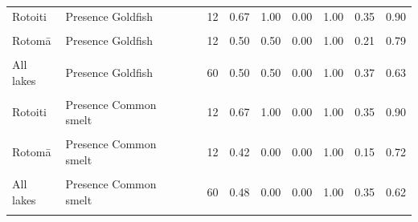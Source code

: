 \documentclass[
  12pt,
  a4paper,
  oneside]{scrbook}
\begin{document}
\begin{longtable}[t]{lllrrrrrrr}
Rotoiti & Presence Goldfish &  & 12 & 0.67 & 1.00 & 0.00 & 1.00 & 0.35 & 0.90\\
\addlinespace
\cellcolor{gray!8}{Rotoehu} & \cellcolor{gray!8}{Presence Goldfish} & \cellcolor{gray!8}{} & \cellcolor{gray!8}{12} & \cellcolor{gray!8}{1.00} & \cellcolor{gray!8}{1.00} & \cellcolor{gray!8}{1.00} & \cellcolor{gray!8}{1.00} & \cellcolor{gray!8}{0.74} & \cellcolor{gray!8}{1.00}\\
Rotomā & Presence Goldfish &  & 12 & 0.50 & 0.50 & 0.00 & 1.00 & 0.21 & 0.79\\
\cellcolor{gray!8}{Ōkāreka} & \cellcolor{gray!8}{Presence Goldfish} & \cellcolor{gray!8}{} & \cellcolor{gray!8}{12} & \cellcolor{gray!8}{0.25} & \cellcolor{gray!8}{0.00} & \cellcolor{gray!8}{0.00} & \cellcolor{gray!8}{1.00} & \cellcolor{gray!8}{0.05} & \cellcolor{gray!8}{0.57}\\
All lakes & Presence Goldfish &  & 60 & 0.50 & 0.50 & 0.00 & 1.00 & 0.37 & 0.63\\
\cellcolor{gray!8}{Rotorua} & \cellcolor{gray!8}{Presence Common smelt} & \cellcolor{gray!8}{} & \cellcolor{gray!8}{12} & \cellcolor{gray!8}{0.25} & \cellcolor{gray!8}{0.00} & \cellcolor{gray!8}{0.00} & \cellcolor{gray!8}{1.00} & \cellcolor{gray!8}{0.05} & \cellcolor{gray!8}{0.57}\\
\addlinespace
Rotoiti & Presence Common smelt &  & 12 & 0.67 & 1.00 & 0.00 & 1.00 & 0.35 & 0.90\\
\cellcolor{gray!8}{Rotoehu} & \cellcolor{gray!8}{Presence Common smelt} & \cellcolor{gray!8}{} & \cellcolor{gray!8}{12} & \cellcolor{gray!8}{0.50} & \cellcolor{gray!8}{0.50} & \cellcolor{gray!8}{0.00} & \cellcolor{gray!8}{1.00} & \cellcolor{gray!8}{0.21} & \cellcolor{gray!8}{0.79}\\
Rotomā & Presence Common smelt &  & 12 & 0.42 & 0.00 & 0.00 & 1.00 & 0.15 & 0.72\\
\cellcolor{gray!8}{Ōkāreka} & \cellcolor{gray!8}{Presence Common smelt} & \cellcolor{gray!8}{} & \cellcolor{gray!8}{12} & \cellcolor{gray!8}{0.58} & \cellcolor{gray!8}{1.00} & \cellcolor{gray!8}{0.00} & \cellcolor{gray!8}{1.00} & \cellcolor{gray!8}{0.28} & \cellcolor{gray!8}{0.85}\\
All lakes & Presence Common smelt &  & 60 & 0.48 & 0.00 & 0.00 & 1.00 & 0.35 & 0.62\\
\addlinespace
\cellcolor{gray!8}{Rotorua} & \cellcolor{gray!8}{Presence Kōaro} & \cellcolor{gray!8}{} & \cellcolor{gray!8}{12} & \cellcolor{gray!8}{0.00} & \cellcolor{gray!8}{0.00} & \cellcolor{gray!8}{0.00} & \cellcolor{gray!8}{0.00} & \cellcolor{gray!8}{0.00} & \cellcolor{gray!8}{0.26}\\

\end{longtable}
\end{document}
